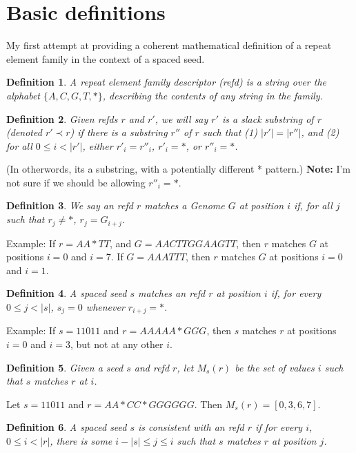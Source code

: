 \documentclass{article}
\newtheorem{definition}{Definition}
\begin{document}
\section{Basic definitions}

My first attempt at providing a coherent mathematical definition of a
repeat element family in the context of a spaced seed.

\begin{definition}
  A {\it repeat element family descriptor (refd)} is a
  string over the alphabet $\{A,C,G,T,*\}$, describing the contents
  of any string in the family.
\end{definition}

\begin{definition}
  Given refds $r$ and $r'$, we will say $r'$ is a {\it slack
    substring} of $r$ (denoted $r' \prec r$) if there is a
  substring $r''$ of $r$ such that (1) $|r'|=|r''|$, and (2) for all
  $0 \leq i < |r'|$, either $r'_i = r''_i$, $r'_i = *$, or $r''_i=*$.
\end{definition}
(In otherwords, its a substring, with a potentially different *
pattern.)
{\bf Note: } I'm not sure if we should be allowing $r''_i=*$.

\begin{definition}
  We say an refd $r$ {\it matches} a Genome $G$ at position $i$ if, for
  all $j$ such that $r_j \neq *$, $r_j = G_{i+j}$.
\end{definition}

Example: If $r = AA*TT$, and $G = AACTTGGAAGTT$, then $r$ matches $G$
at positions $i=0$ and $i=7$.  If $G=AAATTT$, then $r$ matches $G$ at
positions $i=0$ and $i=1$.


\begin{definition}
  A spaced seed $s$ {\it matches} an refd $r$ at position $i$
  if, for every $0 \leq j < |s|$, $s_j = 0$
  whenever $r_{i+j}=*$.
\end{definition}

Example: If $s=11011$ and $r = AAAAA*GGG$, then $s$ matches $r$
at positions $i=0$ and $i=3$, but not at any other $i$.

\begin{definition}
  Given a seed $s$ and refd $r$, let $M_s(r)$ be the set of values $i$
  such that $s$ matches $r$ at $i$.
\end{definition}

Let $s=11011$ and $r = AA*CC*GGGGGG$.  Then $M_s(r) = [0, 3, 6, 7]$.


\begin{definition}
  A spaced seed $s$ is consistent with an refd $r$ if
  for every $i$, $0 \leq i < |r|$, there is some
  $i - |s| \leq j \leq i$ such that $s$ matches $r$ at position $j$.
\end{definition}
\end{document}
